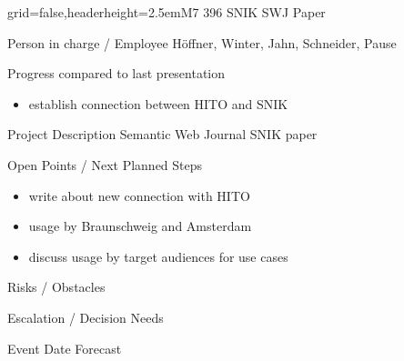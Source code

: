 \documentclass[english]{kiesgrube}
\begin{document}
\begin{poster}{grid=false,headerheight=2.5em}{}{M7 396 SNIK SWJ Paper}{}{}
\begin{posterbox}[name=person,column=0,row=0]{Person in charge / Employee}
Höffner, Winter, Jahn, Schneider, Pause
\end{posterbox}
\begin{posterbox}[name=progress,below=person]{Progress compared to last presentation}
\begin{itemize}
\item establish connection between HITO and SNIK
\end{itemize}
\end{posterbox}
\begin{posterbox}[name=description,column=1,row=0]{Project Description}
Semantic Web Journal SNIK paper
\end{posterbox}
\begin{posterbox}[name=open,column=1,below=description]{Open Points / Next Planned Steps}
\begin{itemize}
\item write about new connection with HITO
\item usage by Braunschweig and Amsterdam
\item discuss usage by target audiences for use cases
\end{itemize}
\end{posterbox}
\begin{posterbox}[name=risks,column=1,below=open]{Risks / Obstacles}
\end{posterbox}
\begin{posterbox}[name=escalation,column=1,below=risks]{Escalation / Decision Needs}
\end{posterbox}
\begin{posterbox}[name=event,column=0,below=progress]{Event Date Forecast}
\begin{tabulary}{\textwidth}{lL}
\end{tabulary}
\end{posterbox}
\footer
\end{poster}
\end{document}
